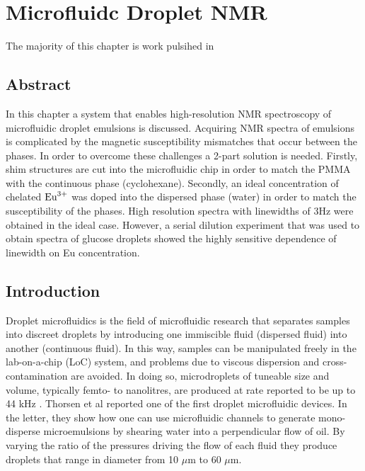 
\chapter{Microfluidc Droplet NMR}\label{Chapter:Droplets}

The majority of this chapter is work pulsihed in \citep{Hale:2018fv}

\section{Abstract}

In this chapter a system that enables high-resolution NMR spectroscopy of microfluidic droplet
emulsions is discussed. Acquiring NMR spectra of emulsions is complicated by the magnetic
susceptibility mismatches that occur between the phases. In order to overcome these challenges a
2-part solution is needed. Firstly, shim structures are cut into the microfluidic chip in order
to match the PMMA with the continuous phase (cyclohexane). Secondly, an ideal concentration of
chelated $\ce{Eu^{3+}}$ was doped into the dispersed phase (water) in order to match the susceptibility of
the phases. High resolution spectra with linewidths of 3Hz were obtained in the ideal case.
However, a serial dilution experiment that was used to obtain spectra of glucose droplets showed
the highly sensitive dependence of linewidth on Eu concentration.

\section{Introduction}

Droplet microfluidics is the field of microfluidic research that separates samples into discreet droplets by introducing one
immiscible fluid (dispersed fluid) into another (continuous fluid). In this way, samples can be manipulated freely in the lab-on-a-chip (LoC) system,
and problems due to viscous dispersion and cross-contamination
are avoided. In doing so, microdroplets of tuneable size and volume,
typically femto- to nanolitres, are produced at rate reported to be up to 44 kHz \citep{RN115}. Thorsen et al\citep{RN104}
reported one of the first droplet microfluidic devices. In the letter, they show how one can use microfluidic channels to
generate mono-disperse microemulsions by shearing water into a perpendicular flow of oil. By varying the ratio of the pressures
driving the flow of each fluid they produce droplets that range in diameter from 10 $\mu\text{m}$ to 60 $\mu\text{m}$.

